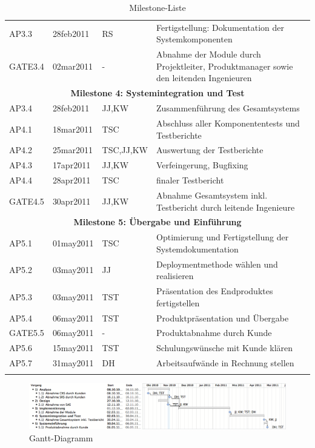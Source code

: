 \begin{longtable}[h]{| l | l | l | p{7.5cm} |}
AP3.3 & 28feb2011 & RS & Fertigstellung: Dokumentation der Systemkomponenten\\
GATE3.4 & 02mar2011 & - & Abnahme der Module durch Projektleiter,
Produktmanager sowie den leitenden Ingenieuren\\
\hline
\multicolumn{4}{|c|}{\bf{Milestone 4: Systemintegration und Test}}\\
\hline
AP3.4 & 28feb2011 & JJ,KW &Zusammenführung des Gesamtsystems\\
AP4.1 & 18mar2011 & TSC & Abschluss aller Komponententests und Testberichte\\
AP4.2 & 25mar2011 & TSC,JJ,KW & Auswertung der Testberichte\\
AP4.3 & 17apr2011 & JJ,KW & Verfeingerung, Bugfixing\\
AP4.4 & 28apr2011 & TSC & finaler Testbericht\\
GATE4.5 & 30apr2011 & JJ,KW & Abnahme Gesamtsystem inkl. Testbericht durch
leitende Ingenieure\\
\hline
\multicolumn{4}{|c|}{\bf{Milestone 5: Übergabe und Einführung}}\\
\hline
AP5.1 & 01may2011 & TSC & Optimierung und Fertigstellung der
Systemdokumentation\\
AP5.2 & 03may2011 & JJ & Deploymentmethode wählen und realisieren\\
AP5.3 & 03may2011 & TST & Präsentation des Endproduktes fertigstellen\\
AP5.4 & 06may2011 & TST & Produktpräsentation und Übergabe\\
GATE5.5 & 06may2011 & - & Produktabnahme durch Kunde\\
AP5.6 & 15may2011 & TST & Schulungswünsche mit Kunde klären\\
AP5.7 & 31may2011 & DH & Arbeitsaufwände in Rechnung stellen\\
\hline
\caption{Milestone-Liste}
\end{longtable}

\clearpage

\begin{landscape}
\begin{figure}
\centering
\includegraphics[width=22cm]{images/Projekt-Gantt.png}
\caption{Gantt-Diagramm}\label{fig:gantt}
\end{figure}
\end{landscape}

